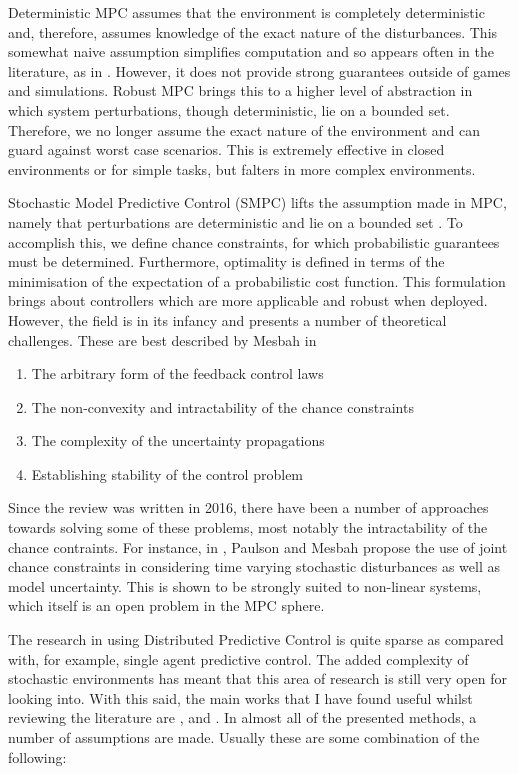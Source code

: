 \documentclass[preprint,11pt]{report}
\begin{document}
Deterministic MPC assumes that the environment is completely deterministic and, therefore, assumes
knowledge of the exact nature of the disturbances. This somewhat naive assumption simplifies
computation and so appears often in the literature, as in \cite{Rosolia2018}. However, it does not
provide strong guarantees outside of games and simulations. Robust MPC brings this to a higher level
of abstraction in which system perturbations, though deterministic, lie on a bounded set. Therefore,
we no longer assume the exact nature of the environment and can guard against worst case scenarios.
This is extremely effective in closed environments or for simple tasks, but falters in more complex
environments.

Stochastic Model Predictive Control (SMPC) lifts the assumption made in MPC, namely that
perturbations are deterministic and lie on a bounded set \cite{Mesbah2016}. To accomplish this, we
define chance constraints, for which probabilistic guarantees must be determined. Furthermore,
optimality is defined in terms of the minimisation of the expectation of a probabilistic
cost function. This formulation brings about controllers which are more applicable and robust when
deployed. However, the field is in its infancy and presents a number of theoretical challenges.
These are best described by Mesbah in \cite{Mesbah2016}

\begin{enumerate}
	\item The arbitrary form of the feedback control laws
	\item The non-convexity and intractability of the chance constraints
	\item The complexity of the uncertainty propagations
	\item Establishing stability of the control problem
\end{enumerate}

Since the review \cite{Mesbah2016} was written in 2016, there have been a number of approaches towards solving
some of
these problems, most notably the intractability of the chance contraints. For instance, in 
\cite{Paulson2019}, Paulson and Mesbah propose the use of joint chance constraints in considering
time varying stochastic disturbances as well as model uncertainty. This is shown to be strongly
suited to non-linear systems, which itself is an open problem in the MPC sphere.


The research in using Distributed Predictive Control is quite sparse as compared with, for example,
single agent predictive control. The added complexity of stochastic environments has meant that this
area of research is still very open for looking into. With this said, the main works that I have
found useful whilst reviewing the literature are \cite{Conte2014}, \cite{Christofides2013} and 
\cite{Giulioni2015}. In almost all of the presented methods, a number of assumptions are made.
Usually these are some combination of the following:
\end{document}
